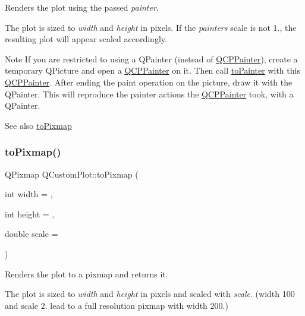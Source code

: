 Renders the plot using the passed {\itshape painter}.

The plot is sized to {\itshape width} and {\itshape height} in pixels. If the {\itshape painter\textquotesingle{}s} scale is not 1., the resulting plot will appear scaled accordingly.

\begin{DoxyNote}{Note}
If you are restricted to using a Q\+Painter (instead of \mbox{\hyperlink{class_q_c_p_painter}{Q\+C\+P\+Painter}}), create a temporary Q\+Picture and open a \mbox{\hyperlink{class_q_c_p_painter}{Q\+C\+P\+Painter}} on it. Then call \mbox{\hyperlink{class_q_custom_plot_a1be68d5c0f1e086d6374d1340a193fb9}{to\+Painter}} with this \mbox{\hyperlink{class_q_c_p_painter}{Q\+C\+P\+Painter}}. After ending the paint operation on the picture, draw it with the Q\+Painter. This will reproduce the painter actions the \mbox{\hyperlink{class_q_c_p_painter}{Q\+C\+P\+Painter}} took, with a Q\+Painter.
\end{DoxyNote}
\begin{DoxySeeAlso}{See also}
\mbox{\hyperlink{class_q_custom_plot_aabb974d71ce96c137dc04eb6eab844fe}{to\+Pixmap}} 
\end{DoxySeeAlso}
\mbox{\label{class_q_custom_plot_aabb974d71ce96c137dc04eb6eab844fe}} 
\subsubsection{\texorpdfstring{toPixmap()}{toPixmap()}}
{\footnotesize\ttfamily Q\+Pixmap Q\+Custom\+Plot\+::to\+Pixmap (\begin{DoxyParamCaption}\item[{int}]{width = {},  }\item[{int}]{height = {},  }\item[{double}]{scale = {} }\end{DoxyParamCaption})}

Renders the plot to a pixmap and returns it.

The plot is sized to {\itshape width} and {\itshape height} in pixels and scaled with {\itshape scale}. (width 100 and scale 2. lead to a full resolution pixmap with width 200.)

